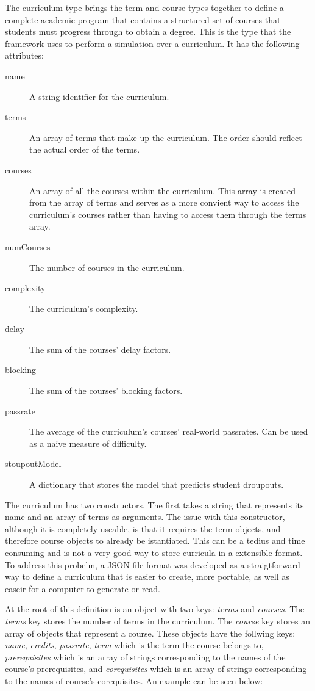 \documentclass[botnum, fleqn]{unmeethesis}
\begin{document}
The curriculum type brings the term and course types together to define a complete academic program that contains a structured set of courses that students must progress through to obtain a degree. This is the type that the framework uses to perform a simulation over a curriculum. It has the following attributes:

\begin{description}
\item [name] A string identifier for the curriculum.
\item [terms] An array of terms that make up the curriculum. The order should reflect the actual order of the terms.
\item [courses] An array of all the courses within the curriculum. This array is created from the array of terms and serves as a more convient way to access the curriculum's courses rather than having to access them through the terms array.
\item [numCourses] The number of courses in the curriculum.
\item [complexity] The curriculum's complexity.
\item [delay] The sum of the courses' delay factors.
\item [blocking] The sum of the courses' blocking factors.
\item [passrate] The average of the curriculum's courses' real-world passrates. Can be used as a naive measure of difficulty.
\item [stoupoutModel] A dictionary that stores the model that predicts student droupouts.
\end{description}

The curriculum has two constructors. The first takes a string that represents its name and an array of terms as arguments. The issue with this constructor, although it is completely useable, is that it requires the term objects, and therefore course objects to already be istantiated. This can be a tedius and time consuming and is not a very good way to store curricula in a extensible format. To address this probelm, a JSON file format was developed as a straigtforward way to define a curriculum that is easier to create, more portable, as well as easeir for a computer to generate or read.

At the root of this definition is an object with two keys: \textit{terms} and \textit{courses}. The \textit{terms} key stores the number of terms in the curriculum. The \textit{course} key stores an array of objects that represent a course. These objects have the follwing keys: \textit{name}, \textit{credits}, \textit{passrate}, \textit{term} which is the term the course belongs to, \textit{prerequisites} which is an array of strings corresponding to the names of the course's prerequisites, and \textit{corequisites} which is an array of strings corresponding to the names of course's corequisites. An example can be seen below:
\end{document}
